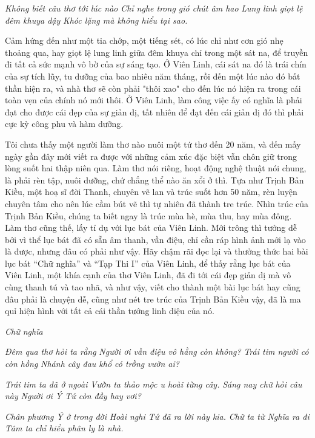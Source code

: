 \documentclass[../main.tex]{subfiles}
\begin{document}
\begin{multicols}{2}
\textit{Không biết câu thơ tới lúc nào} 
\textit{Chỉ nghe trong gió chút âm hao} 
\textit{Lung linh giọt lệ đêm khuya dậy} 
\textit{Khóc lặng mà không hiểu tại sao.} 

Cảm hứng đến như một tia chớp, một tiếng sét, có lúc chỉ như cơn gió nhẹ thoảng qua, hay giọt lệ lung linh giữa đêm khuya chỉ trong một sát na, để truyền đi tất cả sức mạnh vô bờ của sự sáng tạo. Ở Viên Linh, cái sát na đó là trái chín của sự tích lũy, tu dưỡng của bao nhiêu năm tháng, rồi đến một lúc nào đó bất thần hiện ra, và nhà thơ sẽ còn phải "thôi xao" cho đến lúc nó hiện ra trong cái toàn vẹn của chính nó mới thôi. Ở Viên Linh, làm công việc ấy có nghĩa là phải đạt cho được cái đẹp của sự giản dị, tất nhiên để đạt đến cái giản dị đó thì phải cực kỳ công phu và hàm dưỡng. 

Tôi chưa thấy một người làm thơ nào nuôi một tứ thơ đến 20 năm, và đến mấy ngày gần đây mới viết ra được với những cảm xúc đặc biệt vẫn chôn giữ trong lòng suốt hai thập niên qua. Làm thơ nói riêng, hoạt động nghệ thuật nói chung, là phải rèn tập, nuôi dưỡng, chứ chẳng thể nào ăn xổi ở thì. Tựa như Trịnh Bản Kiều, một hoạ sĩ đời Thanh, chuyên vẽ lan và trúc suốt hơn 50 năm, rèn luyện chuyên tâm cho nên lúc cầm bút vẽ thì tự nhiên đã thành tre trúc. Nhìn trúc của Trịnh Bản Kiều, chúng ta biết ngay là trúc mùa hè, mùa thu, hay mùa đông. Làm thơ cũng thế, lấy tỉ dụ với lục bát của Viên Linh. Mới trông thì tưởng dễ bởi vì thể lục bát đã có sẵn âm thanh, vần điệu, chỉ cần ráp hình ảnh mới lạ vào là được, nhưng đâu có phải như vậy. Hãy chậm rãi đọc lại và thưởng thức hai bài lục bát “Chữ nghĩa” và “Tạp Thi I” của Viên Linh, để thấy rằng lục bát của Viên Linh, một khía cạnh của thơ Viên Linh, đã đi tới cái đẹp giản dị mà vô cùng thanh tú và tao nhã, và như vậy, viết cho thành một bài lục bát hay cũng đâu phải là chuyện dễ, cũng như nét tre trúc của Trịnh Bản Kiều vậy, đã là ma quỉ hiện hình với tất cả cái thần tướng linh diệu của nó. 

\textit{Chữ nghĩa }

\textit{Đêm qua thơ hỏi ta rằng} 
\textit{Người ơi vần điệu vô hằng còn không?} 
\textit{Trái tim người có còn hồng} 
\textit{Nhánh cây đau khổ có trồng vườn ai?} 

\textit{Trái tim ta đã ở ngoài} 
\textit{Vườn ta thảo mộc u hoài từng cây.} 
\textit{Sáng nay chữ hỏi câu này} 
\textit{Người ơi Ý Tứ còn đầy hay vơi?} 

\textit{Chân phương Ý ở trong đời} 
\textit{Hoài nghi Tứ đã ra lời này kia.} 
\textit{Chữ ta từ Nghĩa ra đi} 
\textit{Tâm ta chỉ hiểu phân ly là nhà.} 


\end{multicols}
\end{document}
